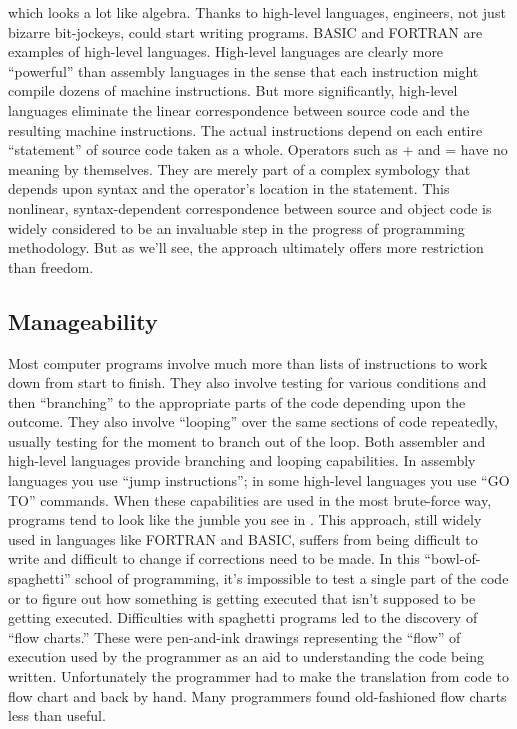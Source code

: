 which looks a lot like algebra. Thanks to high-level languages, engineers,
not just bizarre bit-jockeys, could start writing programs. BASIC
and FORTRAN are examples of high-level languages. High-level languages
are clearly more {}``powerful'' than assembly languages in the sense
that each instruction might compile dozens of machine instructions.
But more significantly, high-level languages eliminate the linear
correspondence between source code and the resulting machine instructions.
The actual instructions depend on each entire {}``statement'' of
source code taken as a whole. Operators such as + and = have no meaning
by themselves. They are merely part of a complex symbology that depends
upon syntax and the operator's location in the statement. This nonlinear,
syntax-dependent correspondence between source and object code is
widely considered to be an invaluable step in the progress of programming
methodology. But as we'll see, the approach ultimately offers more
restriction than freedom.


\subsection{Manageability}

Most computer programs involve much more than lists of instructions
to work down from start to finish. They also involve testing for various
conditions and then {}``branching'' to the appropriate parts of the
code depending upon the outcome. They also involve {}``looping''
over the same sections of code repeatedly, usually testing for the
moment to branch out of the loop. Both assembler and high-level languages
provide branching and looping capabilities. In assembly languages
you use {}``jump instructions''; in some high-level languages you
use {}``GO TO'' commands. When these capabilities are used in the
most brute-force way, programs tend to look like the jumble you see
in . This approach, still widely used in languages like
FORTRAN and BASIC, suffers from being difficult to write and difficult
to change if corrections need to be made. In this {}``bowl-of-spaghetti''
school of programming, it's impossible to test a single part of the
code or to figure out how something is getting executed that isn't
supposed to be getting executed. Difficulties with spaghetti programs
led to the discovery of {}``flow charts.'' These were pen-and-ink
drawings representing the {}``flow'' of execution used by the programmer
as an aid to understanding the code being written. Unfortunately the
programmer had to make the translation from code to flow chart and
back by hand. Many programmers found old-fashioned flow charts less
than useful.


